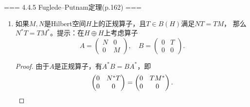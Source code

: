 === 4.4.5 Fuglede--Putnam定理(p.162) ===
\begin{enumerate}
\item[1] 如果$M,N$是Hilbert空间$H$上的正规算子，且$T \in B(H)$满足$NT=TM$，
那么$N^*T=TM^*$。提示：在$H \oplus H$上考虑算子
\[A=\begin{pmatrix}N&0\\0&M\end{pmatrix}, \quad B=\begin{pmatrix}0&T\\0&0\end{pmatrix}.\]
\begin{proof}
    由于$A$是正规算子，有$A^*B=BA^*$，即
    \[\begin{pmatrix}0&N^*T\\0&0\end{pmatrix}=\begin{pmatrix}0&TM^*\\0&0\end{pmatrix}.\qedhere\]
\end{proof}
\end{enumerate}

